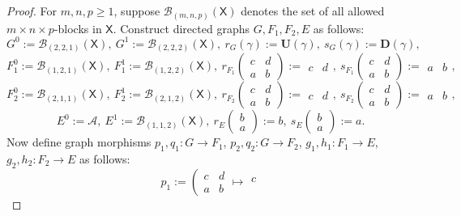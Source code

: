 \documentclass[a4paper,reqno,12pt]{amsart}
\theoremstyle{definition}
\theoremstyle{remark}
\begin{document}
\begin{proof}
For $m,n,p\ge 1$, suppose $\mathcal{B}_{(m,n,p)}(\mathsf{X})$ denotes the set of all allowed $m\times n\times p$-blocks in $\mathsf{X}$. Construct directed graphs $G,F_1,F_2,E$ as follows: \[G^0:=\mathcal{B}_{(2,2,1)}(\mathsf{X}),~G^1:=\mathcal{B}_{(2,2,2)}(\mathsf{X}),~r_G(\gamma):=\mathbf{U}(\gamma),~s_G(\gamma):=\mathbf{D}(\gamma),\] \[F_1^0:=\mathcal{B}_{(1,2,1)}(\mathsf{X}),~F_1^1:=\mathcal{B}_{(1,2,2)}(\mathsf{X}),~r_{F_1}\left(\begin{matrix}
c & d\\
a & b
\end{matrix}\right):=\begin{matrix}
c & d
\end{matrix},~s_{F_1}\left(\begin{matrix}
c & d\\
a & b
\end{matrix}\right):=\begin{matrix}
a & b
\end{matrix},\] 
\[F_2^0:=\mathcal{B}_{(2,1,1)}(\mathsf{X}),~F_2^1:=\mathcal{B}_{(2,1,2)}(\mathsf{X}),~r_{F_2}\left(\begin{matrix}
c & d\\
a & b
\end{matrix}\right):=\begin{matrix}
c & d
\end{matrix},~s_{F_2}\left(\begin{matrix}
c & d\\
a & b
\end{matrix}\right):=\begin{matrix}
a & b
\end{matrix},\] 
\[E^0:=\mathcal{A},~E^1:=\mathcal{B}_{(1,1,2)}(\mathsf{X}),~r_E\left(\begin{matrix}
b\\
a
\end{matrix}\right):=b,~s_E\left(\begin{matrix}
b\\
a
\end{matrix}\right):=a.\] Now define graph morphisms $p_1,q_1:G\longrightarrow F_1$, $p_2,q_2:G\longrightarrow F_2$, $g_1,h_1:F_1\longrightarrow E$, $g_2,h_2:F_2\longrightarrow E$ as follows:
\[p_1:=\left(\begin{matrix}
c & d\\
a & b
\end{matrix}\longmapsto \begin{matrix}
c\\

\end{matrix}\]
\end{proof}
\end{document}
